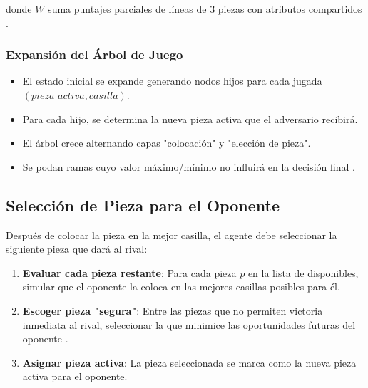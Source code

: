 \documentclass[conference]{IEEEtran}
\begin{document}
donde $W$ suma puntajes parciales de líneas de 3 piezas con atributos compartidos \cite{santana2012}.

\subsubsection{Expansión del Árbol de Juego}
\begin{itemize}
\item El estado inicial se expande generando nodos hijos para cada jugada $(pieza\_activa, casilla)$.
\item Para cada hijo, se determina la nueva pieza activa que el adversario recibirá.
\item El árbol crece alternando capas "colocación" y "elección de pieza".
\item Se podan ramas cuyo valor máximo/mínimo no influirá en la decisión final \cite{russell2016}.
\end{itemize}

\subsection{Selección de Pieza para el Oponente}



Después de colocar la pieza en la mejor casilla, el agente debe seleccionar la siguiente pieza que dará al rival:


\begin{enumerate}
\item \textbf{Evaluar cada pieza restante}: Para cada pieza $p$ en la lista de disponibles, simular que el oponente la coloca en las mejores casillas posibles para él.
\item \textbf{Escoger pieza "segura"}: Entre las piezas que no permiten victoria inmediata al rival, seleccionar la que minimice las oportunidades futuras del oponente \cite{santana2012}.
\item \textbf{Asignar pieza activa}: La pieza seleccionada se marca como la nueva pieza activa para el oponente.
\end{enumerate}
\end{document}
